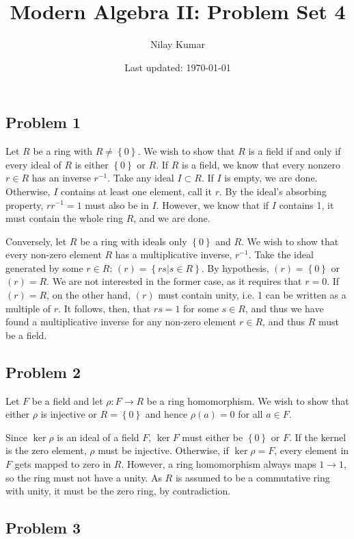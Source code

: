 \documentclass{../../mathnotes}
\title{Modern Algebra II: Problem Set 4}
\author{Nilay Kumar}
\date{Last updated: \today}
\begin{document}
\maketitle

\subsection*{Problem 1}

Let $R$ be a ring with $R\neq\left\{ 0 \right\}$. We wish to show that $R$ is a field if and only if every ideal of $R$
is either $\left\{ 0 \right\}$ or $R$. If $R$ is a field, we know that every nonzero $r\in R$ has an inverse $r^{-1}$.
Take any ideal $I\subset R$. If $I$ is empty, we are done. Otherwise, $I$ contains at least one element, call it $r$.
By the ideal's absorbing property, $rr^{-1}=1$ must also be in $I$. However, we know that if $I$ contains 1, it must
contain the whole ring $R$, and we are done.

Conversely, let $R$ be a ring with ideals only $\left\{ 0 \right\}$ and $R$. We wish to show that every non-zero element 
$R$ has a multiplicative inverse, $r^{-1}$. Take the ideal generated by some $r\in R$: $(r)=\left\{ rs | s\in R \right\}$.
By hypothesis, $(r)=\left\{ 0 \right\}$ or $(r)=R$. We are not interested in the former case, as it requires that $r=0$.
If $(r)=R$, on the other hand, $(r)$ must contain unity, i.e. 1 can be written as a multiple of $r$. It follows, then, that
$rs=1$ for some $s\in R$, and thus we have found a multiplicative inverse for any non-zero element $r\in R$, and thus $R$
must be a field.

\subsection*{Problem 2}

Let $F$ be a field and let $\rho:F\to R$ be a ring homomorphism. We wish to show that either $\rho$ is injective or
$R=\left\{ 0 \right\}$ and hence $\rho(a)=0$ for all $a\in F$.

Since $\ker\rho$ is an ideal of a field $F$,  $\ker F$ must either be $\left\{ 0 \right\}$ or $F$. If the kernel is
the zero element, $\rho$ must be injective. Otherwise, if $\ker\rho=F$, every element in $F$ gets mapped to zero in
$R$. However, a ring homomorphism always maps $1\to 1$, so the ring must not have a unity. As $R$ is assumed to be a
commutative ring with unity, it must be the zero ring, by contradiction.

\subsection*{Problem 3}
\end{document}
